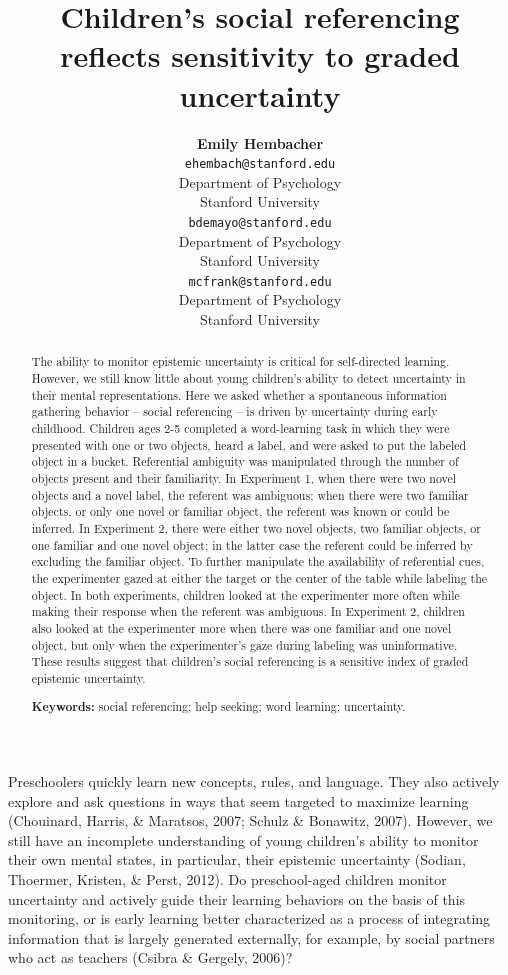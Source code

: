 \documentclass[10pt, letterpaper]{article}
\title{Children's social referencing reflects sensitivity to graded uncertainty}
\author{{\large \bf Emily  Hembacher} \\ \texttt{ehembach@stanford.edu} \\ Department of Psychology \\ Stanford University \And {\large \bf Benjamin deMayo} \\ \texttt{bdemayo@stanford.edu} \\ Department of Psychology \\ Stanford University \And {\large \bf Michael C. Frank} \\ \texttt{mcfrank@stanford.edu} \\ Department of Psychology \\ Stanford University}
\begin{document}
\maketitle

\begin{abstract}
The ability to monitor epistemic uncertainty is critical for
self-directed learning. However, we still know little about young
children's ability to detect uncertainty in their mental
representations. Here we asked whether a spontaneous information
gathering behavior -- social referencing -- is driven by uncertainty
during early childhood. Children ages 2-5 completed a word-learning task
in which they were presented with one or two objects, heard a label, and
were asked to put the labeled object in a bucket. Referential ambiguity
was manipulated through the number of objects present and their
familiarity. In Experiment 1, when there were two novel objects and a
novel label, the referent was ambiguous; when there were two familiar
objects, or only one novel or familiar object, the referent was known or
could be inferred. In Experiment 2, there were either two novel objects,
two familiar objects, or one familiar and one novel object; in the
latter case the referent could be inferred by excluding the familiar
object. To further manipulate the availability of referential cues, the
experimenter gazed at either the target or the center of the table while
labeling the object. In both experiments, children looked at the
experimenter more often while making their response when the referent
was ambiguous. In Experiment 2, children also looked at the experimenter
more when there was one familiar and one novel object, but only when the
experimenter's gaze during labeling was uninformative. These results
suggest that children's social referencing is a sensitive index of
graded epistemic uncertainty.

\textbf{Keywords:}
social referencing; help seeking; word learning; uncertainty.
\end{abstract}

Preschoolers quickly learn new concepts, rules, and language. They also
actively explore and ask questions in ways that seem targeted to
maximize learning (Chouinard, Harris, \& Maratsos, 2007; Schulz \&
Bonawitz, 2007). However, we still have an incomplete understanding of
young children's ability to monitor their own mental states, in
particular, their epistemic uncertainty (Sodian, Thoermer, Kristen, \&
Perst, 2012). Do preschool-aged children monitor uncertainty and
actively guide their learning behaviors on the basis of this monitoring,
or is early learning better characterized as a process of integrating
information that is largely generated externally, for example, by social
partners who act as teachers (Csibra \& Gergely, 2006)?
\end{document}
